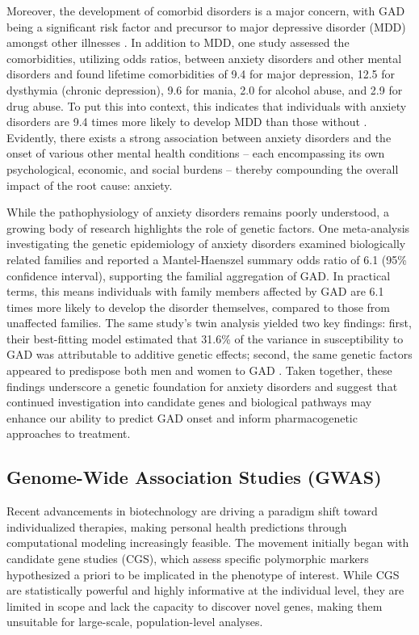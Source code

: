 \documentclass[12pt]{article}
\begin{document}
Moreover, the development of comorbid disorders is a major concern, with GAD being a significant risk factor and precursor to major depressive disorder (MDD) amongst other illnesses \cite{Gonzalez2016}. In addition to MDD, one study assessed the comorbidities, utilizing odds ratios, between anxiety disorders and other mental disorders and found lifetime comorbidities of 9.4 for major depression, 12.5 for dysthymia (chronic depression), 9.6 for mania, 2.0 for alcohol abuse, and 2.9 for drug abuse. To put this into context, this indicates that individuals with anxiety disorders are 9.4 times more likely to develop MDD than those without \cite{Kessler2001}. Evidently, there exists a strong association between anxiety disorders and the onset of various other mental health conditions -- each encompassing its own psychological, economic, and social burdens -- thereby compounding the overall impact of the root cause: anxiety. \par

While the pathophysiology of anxiety disorders remains poorly understood, a growing body of research highlights the role of genetic factors. One meta-analysis investigating the genetic epidemiology of anxiety disorders examined biologically related families and reported a Mantel-Haenszel summary odds ratio of 6.1 (95\% confidence interval), supporting the familial aggregation of GAD. In practical terms, this means individuals with family members affected by GAD are 6.1 times more likely to develop the disorder themselves, compared to those from unaffected families. The same study’s twin analysis yielded two key findings: first, their best-fitting model estimated that 31.6\% of the variance in susceptibility to GAD was attributable to additive genetic effects; second, the same genetic factors appeared to predispose both men and women to GAD \cite{Hettema2001}. Taken together, these findings underscore a genetic foundation for anxiety disorders and suggest that continued investigation into candidate genes and biological pathways may enhance our ability to predict GAD onset and inform pharmacogenetic approaches to treatment. \par


\subsection{Genome-Wide Association Studies (GWAS)}
Recent advancements in biotechnology are driving a paradigm shift toward individualized therapies, making personal health predictions through computational modeling increasingly feasible. The movement initially began with candidate gene studies (CGS), which assess specific polymorphic markers hypothesized a priori to be implicated in the phenotype of interest. While CGS are statistically powerful and highly informative at the individual level, they are limited in scope and lack the capacity to discover novel genes, making them unsuitable for large-scale, population-level analyses. \par
\end{document}
